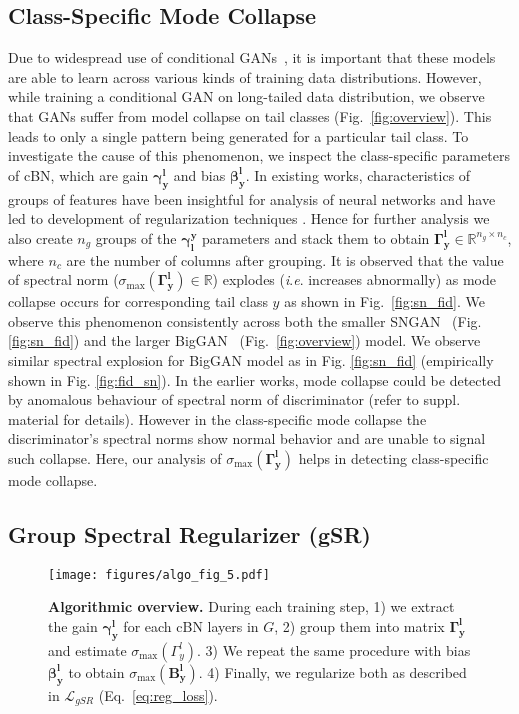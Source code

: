 \documentclass[runningheads,table]{llncs}
\newcommand{\ie}{\textit{i}.\textit{e}. }
\begin{document}
\subsection{Class-Specific Mode Collapse}
\label{subsec:class-specific-collapse}
Due to widespread use of conditional GANs~\cite{brock2018large, miyato2018cgans}, it is important that these models are able to learn across various kinds of training data distributions.
However, while training a conditional GAN on long-tailed data distribution, we observe that 
GANs suffer from model collapse on tail classes (Fig.~\ref{fig:overview}). This leads to only a single pattern being generated for a particular tail class. To investigate the cause of this phenomenon, we inspect the class-specific parameters of cBN, which are gain $\mathbf{\gamma^l_{y}}$ and bias $\mathbf{\beta^l_{y}}$.
In existing works, characteristics of groups of features have been insightful for analysis of neural networks and have led to development of regularization techniques  \cite{wu2018group, huang2021group}.
Hence for further analysis we also create $n_g$ groups of the $\mathbf{\gamma^y_{l}}$ parameters and stack them to obtain $\mathbf{\Gamma^l_y} \in \mathbb{R}^{n_g \times n_c}$, where $n_c$ are the number of columns after grouping. It is observed that the value of spectral norm ($\sigma_{\max}(\mathbf{\Gamma_y^l}) \in \mathbb{R}$) explodes (\ie increases abnormally) as mode collapse occurs for corresponding tail class $y$  as shown in Fig.~\ref{fig:sn_fid}. We observe this phenomenon consistently across both the smaller SNGAN~\cite{miyato2018spectral} (Fig. \ref{fig:sn_fid}) and the larger BigGAN~\cite{brock2018large} (Fig.~\ref{fig:overview}) model. We observe similar spectral explosion for BigGAN model as in Fig. \ref{fig:sn_fid} (empirically shown in Fig. \ref{fig:fid_sn}). In the earlier works, mode collapse could be detected by anomalous behaviour of spectral norm of discriminator (refer to suppl. material for details). However in the class-specific mode collapse the discriminator's spectral norms show normal behavior and are unable to signal such collapse. Here, our analysis of $\sigma_{\max}(\mathbf{\Gamma^l_y})$ helps in detecting class-specific mode collapse. \\

\subsection{Group Spectral Regularizer (gSR)}
\label{sec:regularizer}
\begin{figure}[t]
    \centering
    \texttt{[image: figures/algo\_fig\_5.pdf]}
    \caption{\textbf{Algorithmic overview.} During each training step, 1) we extract the gain $\mathbf{\gamma^l_y}$ for each cBN layers in $G$, 2) group them into matrix $\mathbf{\Gamma^l_y}$ and estimate $\sigma_{\max} (\Gamma^l_y)$. 3) We repeat the same procedure with bias $\mathbf{\beta^l_y}$ to obtain $\sigma_{\max} (\mathbf{B^l_y})$. 4) Finally, we regularize both as described in $\mathcal{L}_{gSR}$ (Eq.~\ref{eq:reg_loss}).}
    \label{fig:algo}
\end{figure}
\end{document}
